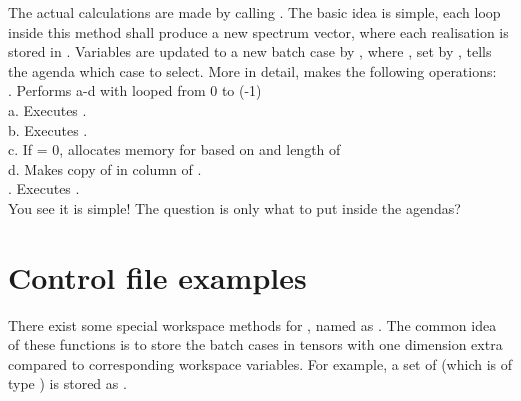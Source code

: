 The actual calculations are made by calling . The
basic idea is simple, each loop inside this method shall
produce a new spectrum vector, where each realisation is stored in
. Variables are updated to a new batch case by
, where , set by
, tells the agenda which case to select.
More in detail,  makes the following operations:\\
. Performs a-d with  looped from 0 to (-1)\\
\indent a. Executes . \\
\indent b. Executes .\\
\indent c. If  = 0, allocates memory for
 based on  and length of  \\
\indent d. Makes copy of  in column  of .\\
. Executes .\\
You see it is simple! The question is only what to put inside the agendas?


\section{Control file examples}
%
There exist some special workspace methods for
, named as
.  The common idea of these functions is to
store the batch cases in tensors with one dimension extra compared to
corresponding workspace variables. For example, a set of
 (which is of type ) is stored
as .

